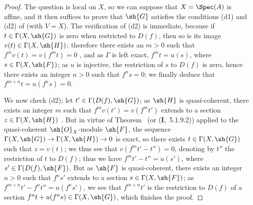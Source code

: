 \begin{proof}
The question is local on $X$, so we can suppose that $X=\Spec(A)$ is affine, and it then suffices to prove that $\sh{G}$ satisfies the conditions (d1) and (d2) of  (with $V=X$).
The verification of (d2) is immediate, because if $t\in\Gamma(X,\sh{G})$ is zero when restricted to $D(f)$, then so is its image $v(t)\in\Gamma(X,\sh{H})$; therefore there exists an $m>0$ such that $f^m v(t)=v(f^m t)=0$ , and as $\Gamma$ is left exact, $f^m t=u(s)$, where $s\in\Gamma(X,\sh{F})$; as $u$ is injective, the restriction of $s$ to $D(f)$ is zero, hence  there exists an integer $n>0$ such that $f^n s=0$; we finally deduce that $f^{m+n}t=u(f^n s)=0$.

We now check (d2); let $t'\in\Gamma(D(f),\sh{G})$; as $\sh{H}$ is quasi-coherent, there exists an integer $m$ such that $f^m v(t')=v(f^m t')$ extends to a section $z\in\Gamma(X,\sh{H})$ .
But in virtue of Theorem~ (or (\textbf{I},~5.1.9.2)) applied to the quasi-coherent $\sh{O}_X$-module $\sh{F}$, the sequence $\Gamma(X,\sh{G})\to\Gamma(X,\sh{H})\to 0$ is exact, so there exists $t\in\Gamma(X,\sh{G})$ such that $z=v(t)$; we thus see that $v(f^m t'-t'')=0$, denoting by $t''$ the restriction of $t$ to $D(f)$; thus we have $f^m t'-t''=u(s')$, where $s'\in\Gamma(D(f),\sh{F})$.
But as $\sh{F}$ is quasi-coherent, there exists an integer $n>0$ such that $f^n s'$ extends to a section $s\in\Gamma(X,\sh{F})$; as $f^{m+n}t'-f^n t''=u(f^n s')$, we see that $f^{m+n}t'$ is the restriction to $D(f)$ of a section $f^n t+u(f^n s)\in\Gamma(X,\sh{G})$, which finishes the proof.
\end{proof}
